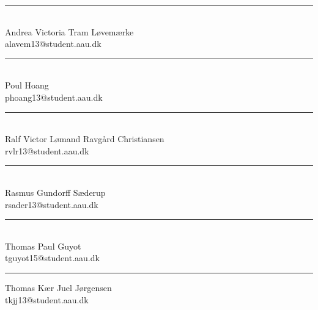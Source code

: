 \vspace{1.5\baselineskip}
\begin{minipage}[b]{0.45\textwidth}
 \centering
 \rule{\textwidth}{0.45pt}\\
  Andrea Victoria Tram Løvemærke\\
 {\footnotesize alavem13@student.aau.dk}
\end{minipage}
\vspace{1.5\baselineskip}
\hfill
\begin{minipage}[b]{0.45\textwidth}
 \centering
 \rule{\textwidth}{0.45pt}\\
  Poul Hoang\\
 {\footnotesize phoang13@student.aau.dk}
\end{minipage}
\vspace{1.5\baselineskip}
\hfill
\begin{minipage}[b]{0.45\textwidth}
 \centering
 \rule{\textwidth}{0.45pt}\\
  Ralf Victor Lømand Ravgård Christiansen\\
 {\footnotesize rvlr13@student.aau.dk}
\end{minipage}
\vspace{1.5\baselineskip}
\hfill
\begin{minipage}[b]{0.45\textwidth}
 \centering
 \rule{\textwidth}{0.45pt}\\
  Rasmus Gundorff Sæderup\\
 {\footnotesize rsader13@student.aau.dk}
\end{minipage}
\vspace{1.5\baselineskip}
\hfill
\begin{minipage}[b]{0.45\textwidth}
 \centering
 \rule{\textwidth}{0.45pt}\\
  Thomas Paul Guyot\\
 {\footnotesize tguyot15@student.aau.dk}

\end{minipage}
\vspace{1.5\baselineskip}
\hfill
\begin{minipage}[b]{0.45\textwidth}
 \centering
 \rule{\textwidth}{0.5pt}
   Thomas Kær Juel Jørgensen\\
 {\footnotesize tkjj13@student.aau.dk}
\end{minipage}